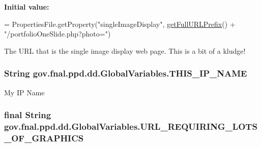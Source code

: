 {\bfseries Initial value\-:}
\begin{DoxyCode}
= PropertiesFile.getProperty(\textcolor{stringliteral}{"singleImageDisplay"},
            \hyperlink{classgov_1_1fnal_1_1ppd_1_1dd_1_1GlobalVariables_ab7639ebfcc296b374593079a06026c65}{getFullURLPrefix}() + \textcolor{stringliteral}{"/portfolioOneSlide.php?photo="})
\end{DoxyCode}
The U\-R\-L that is the single image display web page. This is a bit of a kludge! \hypertarget{classgov_1_1fnal_1_1ppd_1_1dd_1_1GlobalVariables_a35adf140ccbaaf275e34d1539424828a}{
\subsubsection[{T\-H\-I\-S\-\_\-\-I\-P\-\_\-\-N\-A\-M\-E}]{\setlength{\rightskip}{0pt plus 5cm}String gov.\-fnal.\-ppd.\-dd.\-Global\-Variables.\-T\-H\-I\-S\-\_\-\-I\-P\-\_\-\-N\-A\-M\-E\hspace{0.3cm}{\ttfamily [static]}}}\label{classgov_1_1fnal_1_1ppd_1_1dd_1_1GlobalVariables_a35adf140ccbaaf275e34d1539424828a}
My I\-P Name \hypertarget{classgov_1_1fnal_1_1ppd_1_1dd_1_1GlobalVariables_aaf1f42e774f4d514f50578db3ea33733}{
\subsubsection[{U\-R\-L\-\_\-\-R\-E\-Q\-U\-I\-R\-I\-N\-G\-\_\-\-L\-O\-T\-S\-\_\-\-O\-F\-\_\-\-G\-R\-A\-P\-H\-I\-C\-S}]{\setlength{\rightskip}{0pt plus 5cm}final String gov.\-fnal.\-ppd.\-dd.\-Global\-Variables.\-U\-R\-L\-\_\-\-R\-E\-Q\-U\-I\-R\-I\-N\-G\-\_\-\-L\-O\-T\-S\-\_\-\-O\-F\-\_\-\-G\-R\-A\-P\-H\-I\-C\-S\hspace{0.3cm}{\ttfamily [static]}}}\label{classgov_1_1fnal_1_1ppd_1_1dd_1_1GlobalVariables_aaf1f42e774f4d514f50578db3ea33733}
